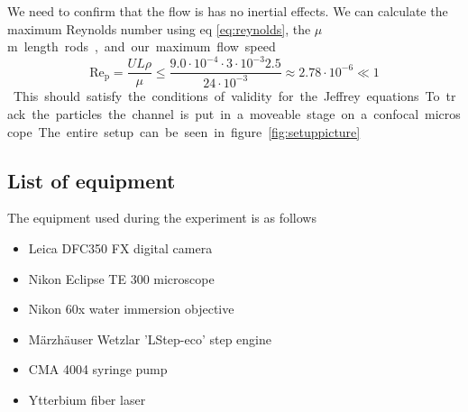 \noindent We need to confirm that the flow is has no inertial effects. We can calculate the maximum Reynolds number using eq \ref{eq:reynolds}, the \unit[3]{$\mu$m} length rods, and our maximum flow speed.

\begin{equation}
\operatorname{Re_p} = \frac{U L \rho}{\mu} 
\leq \frac{9.0\cdot 10^{-4} \cdot 3 \cdot 10^{-3} 2.5 }{24 \cdot 10^{-3}} 
\approx	 	2.78  \cdot 10^{-6} \ll 1
\end{equation}

This should satisfy the conditions of validity for the Jeffrey equations. 

To track the particles the channel is put in a moveable stage on a confocal microscope. The entire setup can be seen in figure \ref{fig:setuppicture}



\subsection{List of equipment}
 The equipment used during the experiment is as follows
\begin{itemize}
\item Leica DFC350 FX digital camera 
\item Nikon Eclipse TE 300 microscope
\item Nikon 60x water immersion objective
\item Märzhäuser Wetzlar 'LStep-eco' step engine
\item CMA 4004 syringe pump
\item Ytterbium fiber laser  %
\end{itemize}

%
%
	
